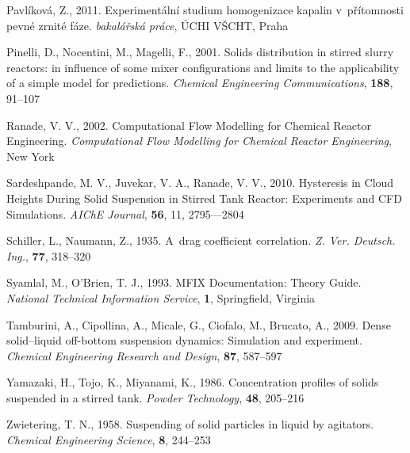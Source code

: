 \begin{thebibliography}{99}
 Pavlíková, Z., 2011. Experimentální studium homogenizace kapalin v~přítomnosti pevné zrnité fáze. \textit{bakalářská práce}, ÚCHI VŠCHT, Praha 

 Pinelli, D., Nocentini, M., Magelli, F., 2001. Solids distribution in stirred slurry reactors: in influence of some mixer configurations and limits to the applicability of a simple model for predictions.
\textit{Chemical Engineering Communications}, \textbf{188}, 91--107

 Ranade, V. V., 2002. Computational Flow Modelling for Chemical Reactor Engineering. \textit{Computational Flow Modelling for Chemical Reactor Engineering}, New York

 Sardeshpande, M. V., Juvekar, V. A., Ranade, V. V., 2010. Hysteresis in Cloud Heights During Solid Suspension in Stirred Tank Reactor: Experiments and CFD Simulations. \textit{AIChE Journal}, \textbf{56}, 11, 2795---2804

 Schiller, L., Naumann, Z., 1935. A~drag coefficient correlation. \textit{Z. Ver. Deutsch. Ing.}, \textbf{77}, 318--320

 Syamlal, M., O'Brien, T. J., 1993. MFIX Documentation: Theory Guide. \textit{National Technical Information Service}, \textbf{1}, Springfield, Virginia 

 Tamburini, A., Cipollina, A., Micale, G., Ciofalo, M., Brucato, A., 2009. Dense solid–liquid off-bottom suspension dynamics: Simulation and experiment. \textit{Chemical Engineering Research and Design}, \textbf{87}, 587--597

 Yamazaki, H., Tojo, K., Miyanami, K., 1986. Concentration profiles of solids suspended in a stirred tank. \textit{Powder Technology}, \textbf{48}, 205--216

 Zwietering, T. N., 1958. Suspending of solid particles in liquid by agitators. \textit{Chemical Engineering Science}, \textbf{8}, 244--253 

\end{thebibliography}
